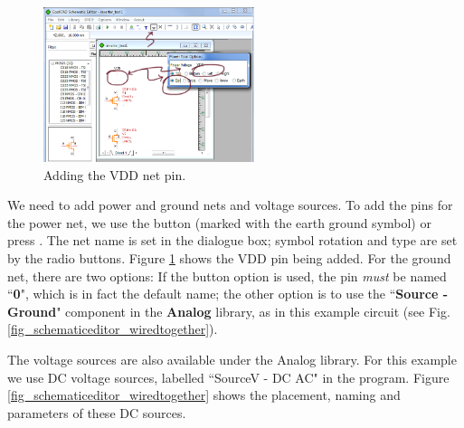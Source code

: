 \begin{figure}
    \includegraphics[width=0.55\textwidth]{./figures/getting_started_figures/SchematicEditor_addingVDD.png}
    \caption{{Adding the VDD net pin.}}
  \label{fig_schematiceditor_addVDD}
\end{figure}

 We need to add power and ground nets and voltage sources. To add the pins for the power net, we use the  button (marked with the earth ground symbol) or press .  The net name is set in the dialogue box; symbol rotation and type are set by the radio buttons.  Figure \ref{fig_schematiceditor_addVDD} shows the VDD pin being added.  For the ground net, there are two options:  If the  button option is used, the pin \textit{must} be named ``\textbf{0}", which is in fact the default name; the other option is to use the ``\textbf{Source - Ground}" component in the \textbf{Analog} library,  as in this example circuit (see Fig. \ref{fig_schematiceditor_wiredtogether}).   

 The voltage sources are also available under the Analog library. For this example we use DC voltage sources, labelled ``SourceV - DC AC" in the program.  Figure \ref{fig_schematiceditor_wiredtogether} shows the placement, naming and parameters of these DC sources. 

